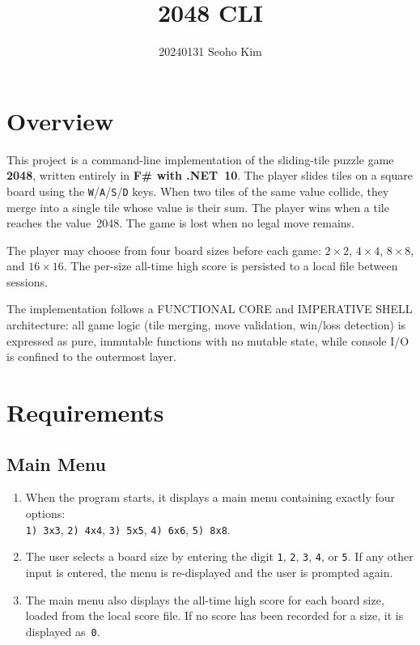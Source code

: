 \documentclass{article} %
\title{\huge\textbf{2048 CLI}}
\author{20240131 Seoho Kim}
\begin{document}
\maketitle
\thispagestyle{fancy}

\section{Overview}

This project is a command-line implementation of the sliding-tile puzzle game \textbf{2048},
written entirely in \textbf{F\# with .NET~10}.
The player slides tiles on a square board using the \texttt{W}/\texttt{A}/\texttt{S}/\texttt{D} keys.
When two tiles of the same value collide, they merge into a single tile whose value is their sum.
The player wins when a tile reaches the value~2048.
The game is lost when no legal move remains.

The player may choose from four board sizes before each game:
$2{\times}2$, $4{\times}4$, $8{\times}8$, and $16{\times}16$.
The per-size all-time high score is persisted to a local file between sessions.

The implementation follows a FUNCTIONAL CORE and IMPERATIVE SHELL architecture:
all game logic (tile merging, move validation, win/loss detection) is expressed as
pure, immutable functions with no mutable state, while console I/O is confined to the
outermost layer.


\section{Requirements}

\subsection{Main Menu}

\begin{enumerate}

	\item When the program starts, it displays a main menu containing exactly four options:\\
	      \texttt{1) 3x3}, \texttt{2) 4x4}, \texttt{3) 5x5}, \texttt{4) 6x6}, \texttt{5) 8x8}.

	\item The user selects a board size by entering the digit
	      \texttt{1}, \texttt{2}, \texttt{3}, \texttt{4}, or \texttt{5}.
	      If any other input is entered, the menu is re-displayed and the user is prompted again.

	\item The main menu also displays the all-time high score for each board size,
	      loaded from the local score file.
	      If no score has been recorded for a size, it is displayed as~\texttt{0}.

\end{enumerate}
\end{document}
